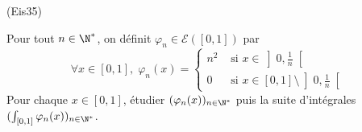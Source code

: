 \begin{tiny}(Eis35)\end{tiny} Pour tout $n\in \N^*$, on définit $\varphi_n \in \mathcal{E}(\left[ 0,1 \right])$ par
\[
  \forall x \in \left[ 0,1 \right],\;
  \varphi_n(x) = 
  \left\lbrace
  \begin{aligned}
    n^2 &\text{ si } x \in \left] 0 , \frac{1}{n} \right[ \\
    0 &\text{ si } x \in \left[ 0,1 \right] \setminus \left] 0 , \frac{1}{n} \right[ 
  \end{aligned}
\right.
\]
Pour chaque $x \in \left[ 0, 1 \right]$, étudier $(\varphi_n(x))_{n\in \N^*}$ puis la suite d'intégrales $(\int_{\left[ 0,1 \right]}\varphi_n(x))_{n\in \N^*}$.
